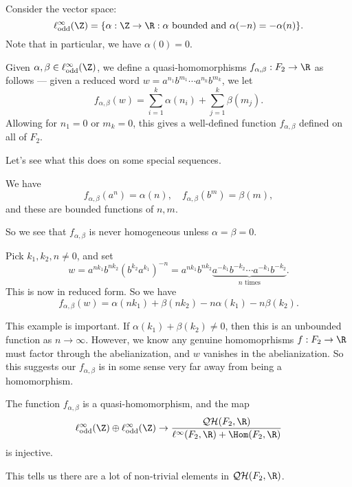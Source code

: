 \documentclass[a4paper]{article}
\newcommand\QH{\mathcal{QH}}
\newcommand\Free{F}
\begin{document}
Consider the vector space:
\[
  \ell_{\mathrm{odd}}^\infty (\Z) = \{\alpha: \Z \to \R : \alpha \text{ bounded and } \alpha(-n) = -\alpha (n)\}.
\]
Note that in particular, we have $\alpha(0) = 0$.

Given $\alpha, \beta \in \ell_{\mathrm{odd}}^\infty(\Z)$, we define a quasi-homomorphisms $f_{\alpha, \beta} : \Free_2 \to \R$ as follows --- given a reduced word $w = a^{n_1} b^{m_1} \cdots a^{n_k}b^{m_k}$, we let
\[
  f_{\alpha, \beta}(w) = \sum_{i= 1}^k \alpha(n_i) + \sum_{j = 1}^k \beta(m_j).
\]
Allowing for $n_1 = 0$ or $m_k = 0$, this gives a well-defined function $f_{\alpha,\beta}$ defined on all of $\Free_2$.

Let's see what this does on some special sequences.
\begin{eg}
  We have
  \[
    f_{\alpha, \beta}(a^n) = \alpha(n),\quad f_{\alpha, \beta}(b^m) = \beta(m),
  \]
  and these are bounded functions of $n, m$.
\end{eg}
So we see that $f_{\alpha, \beta}$ is never homogeneous unless $\alpha = \beta = 0$.

\begin{eg}
  Pick $k_1, k_2, n \not= 0$, and set
  \[
    w = a^{nk_1} b^{nk_2} (b^{k_2}a^{k_1})^{-n} = a^{nk_1} b^{nk_2} \underbrace{a^{-k_1} b^{-k_2} \cdots a^{-k_1} b^{-k_2}}_{n\text{ times}}.
  \]
  This is now in reduced form. So we have
  \[
    f_{\alpha, \beta}(w) = \alpha(n k_1) + \beta (n k_2) - n \alpha(k_1) - n \beta(k_2).
  \]
\end{eg}
This example is important. If $\alpha(k_1) + \beta(k_2) \not= 0$, then this is an unbounded function as $n \to \infty$. However, we know any genuine homomoprhisms $f: \Free_2 \to \R$ must factor through the abelianization, and $w$ vanishes in the abelianization. So this suggests our $f_{\alpha, \beta}$ is in some sense very far away from being a homomorphism.

\begin{thm}[P.\ Rolli, 2009]
  The function $f_{\alpha, \beta}$ is a quasi-homomorphism, and the map
  \[
    \ell^\infty_{\mathrm{odd}} (\Z) \oplus \ell^\infty_{\mathrm{odd}}(\Z) \to \frac{\QH(\Free_2, \R)}{\ell^\infty(\Free_2, \R) + \Hom(\Free_2, \R)}
  \]
  is injective.
\end{thm}
This tells us there are a lot of non-trivial elements in $\QH(\Free_2, \R)$.
\end{document}
